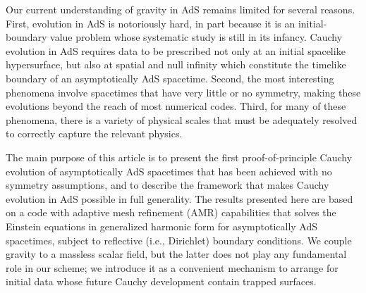 \documentclass[aps,letterpaper,twocolumn,nofootinbib]{revtex4}
\numberwithin{equation}{section}
\begin{document}
Our current understanding of gravity in AdS remains limited for several reasons.
First, evolution in AdS is notoriously hard, in part because it is an initial-boundary value problem whose systematic study is still in its infancy. 
Cauchy evolution in AdS requires data to be prescribed not only at an initial spacelike hypersurface, but also at spatial and null infinity which constitute the timelike boundary of an asymptotically AdS spacetime.
Second, the most interesting phenomena involve spacetimes that have very little or no symmetry, making these evolutions beyond the reach of most numerical codes. 
Third, for many of these phenomena, there is a variety of physical scales that must be adequately resolved to correctly capture the relevant physics.

The main purpose of this article is to present the first proof-of-principle Cauchy evolution of asymptotically AdS spacetimes that has been achieved with no symmetry assumptions, and to describe the framework that makes Cauchy evolution in AdS possible in full generality.
The results presented here are based on a code with adaptive mesh refinement (AMR) capabilities that solves the Einstein equations in generalized harmonic form for asymptotically AdS spacetimes, subject to reflective (i.e., Dirichlet) boundary conditions. We couple gravity to a massless scalar field, 
but the latter does not play any fundamental role in our scheme; we introduce it as a convenient mechanism to arrange for initial data whose future Cauchy development contain trapped surfaces.
\end{document}
